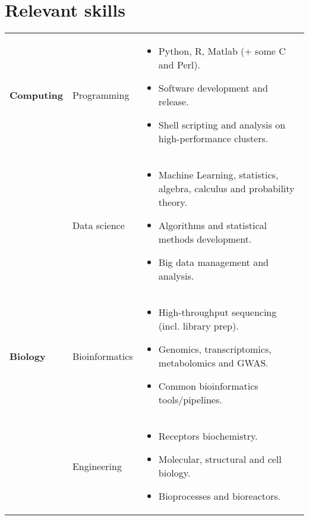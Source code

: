 \documentclass{CV}
\begin{document}
\section*{Relevant skills}
\begin{tabular}{p{} p{} p{}}
\textbf{Computing} & 
	Programming &
		\begin{itemize}\setlength\itemsep{-0.5em}
		\vspace{-1.8em}
		\item Python, R, Matlab (+ some C and Perl).
		\item Software development and release.
		\item Shell scripting and analysis on high-performance clusters.
		\end{itemize}\\
& 
	Data science &
		\begin{itemize}\setlength\itemsep{-0.5em}
		\vspace{-1.8em}
		\item Machine Learning, statistics, algebra, calculus and probability theory.
		\item Algorithms and statistical methods development.
		\item Big data management and analysis.
		\end{itemize}\\
		
\textbf{Biology} & 
	Bioinformatics &
		\begin{itemize}\setlength\itemsep{-0.5em}
		\vspace{-1.8em}
		\item High-throughput sequencing (incl. library prep).
		\item Genomics, transcriptomics, metabolomics and GWAS.
		\item Common bioinformatics tools/pipelines.
		\end{itemize}\\
& 
	Engineering &
		\begin{itemize}\setlength\itemsep{-0.5em}
		\vspace{-1.8em}
		\item Receptors biochemistry.
		\item Molecular, structural and cell biology.
		\item Bioprocesses and bioreactors.
		\end{itemize}\\
		

\end{tabular}
\end{document}
